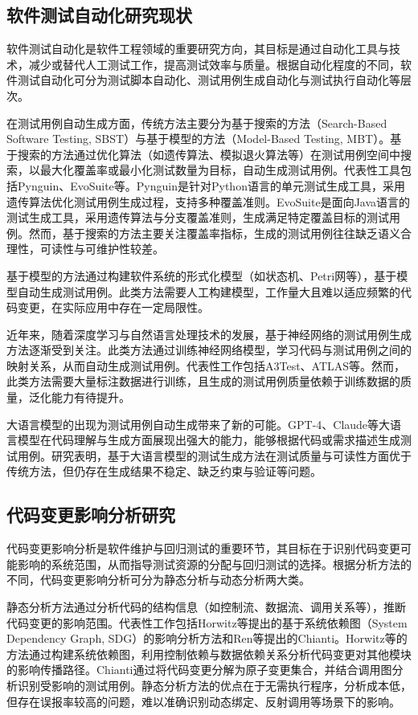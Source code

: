 \subsection{软件测试自动化研究现状}
软件测试自动化是软件工程领域的重要研究方向，其目标是通过自动化工具与技术，减少或替代人工测试工作，提高测试效率与质量。根据自动化程度的不同，软件测试自动化可分为测试脚本自动化、测试用例生成自动化与测试执行自动化等层次。

在测试用例自动生成方面，传统方法主要分为基于搜索的方法（Search-Based Software Testing, SBST）与基于模型的方法（Model-Based Testing, MBT）\cite{AliBriand2007,wuchuan2015path}。基于搜索的方法通过优化算法（如遗传算法、模拟退火算法等）在测试用例空间中搜索，以最大化覆盖率或最小化测试数量为目标，自动生成测试用例。代表性工具包括Pynguin、EvoSuite等。Pynguin是针对Python语言的单元测试生成工具，采用遗传算法优化测试用例生成过程，支持多种覆盖准则\cite{LukasczykKF2023}。EvoSuite是面向Java语言的测试生成工具，采用遗传算法与分支覆盖准则，生成满足特定覆盖目标的测试用例。然而，基于搜索的方法主要关注覆盖率指标，生成的测试用例往往缺乏语义合理性，可读性与可维护性较差。

基于模型的方法通过构建软件系统的形式化模型（如状态机、Petri网等），基于模型自动生成测试用例。此类方法需要人工构建模型，工作量大且难以适应频繁的代码变更，在实际应用中存在一定局限性。

近年来，随着深度学习与自然语言处理技术的发展，基于神经网络的测试用例生成方法逐渐受到关注。此类方法通过训练神经网络模型，学习代码与测试用例之间的映射关系，从而自动生成测试用例。代表性工作包括A3Test、ATLAS等\cite{Watson2019}。然而，此类方法需要大量标注数据进行训练，且生成的测试用例质量依赖于训练数据的质量，泛化能力有待提升。

大语言模型的出现为测试用例自动生成带来了新的可能。GPT-4、Claude等大语言模型在代码理解与生成方面展现出强大的能力，能够根据代码或需求描述生成测试用例。研究表明，基于大语言模型的测试生成方法在测试质量与可读性方面优于传统方法，但仍存在生成结果不稳定、缺乏约束与验证等问题\cite{Riedel2023LLMTest,lixiang2026cer}。

\subsection{代码变更影响分析研究}
代码变更影响分析是软件维护与回归测试的重要环节，其目标在于识别代码变更可能影响的系统范围，从而指导测试资源的分配与回归测试的选择\cite{BohnerArnold1996}。根据分析方法的不同，代码变更影响分析可分为静态分析与动态分析两大类。

静态分析方法通过分析代码的结构信息（如控制流、数据流、调用关系等），推断代码变更的影响范围。代表性工作包括Horwitz等提出的基于系统依赖图（System Dependency Graph, SDG）的影响分析方法\cite{Horwitz1990,yangbo2016var}和Ren等提出的Chianti\cite{Ren2004}。Horwitz等的方法通过构建系统依赖图，利用控制依赖与数据依赖关系分析代码变更对其他模块的影响传播路径。Chianti通过将代码变更分解为原子变更集合，并结合调用图分析识别受影响的测试用例。静态分析方法的优点在于无需执行程序，分析成本低，但存在误报率较高的问题，难以准确识别动态绑定、反射调用等场景下的影响。

